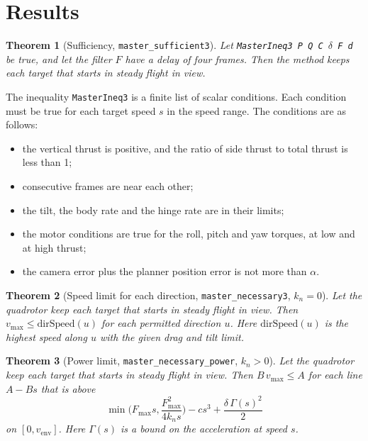 \documentclass[11pt]{article}
\newtheorem{theorem}{Theorem}
\theoremstyle{definition}
\newcommand{\lean}[1]{\texttt{\small #1}}
\begin{document}
\section{Results}

\begin{theorem}[Sufficiency, \lean{master\_sufficient3}]
Let \lean{MasterIneq3 P Q C $\delta$ F d} be true, and let the filter $F$ have a delay of four frames.
Then the method keeps each target that starts in steady flight in view.
\end{theorem}

The inequality \lean{MasterIneq3} is a finite list of scalar conditions.
Each condition must be true for each target speed $s$ in the speed range.
The conditions are as follows:
\begin{itemize}
\item the vertical thrust is positive, and the ratio of side thrust to total thrust is less than 1;
\item consecutive frames are near each other;
\item the tilt, the body rate and the hinge rate are in their limits;
\item the motor conditions are true for the roll, pitch and yaw torques, at low and at high thrust;
\item the camera error plus the planner position error is not more than $\alpha$.
\end{itemize}

\begin{theorem}[Speed limit for each direction, \lean{master\_necessary3}, $k_n = 0$]
Let the quadrotor keep each target that starts in steady flight in view.
Then $v_{\max} \le \mathrm{dirSpeed}(u)$ for each permitted direction $u$.
Here $\mathrm{dirSpeed}(u)$ is the highest speed along $u$ with the given drag and tilt limit.
\end{theorem}

\begin{theorem}[Power limit, \lean{master\_necessary\_power}, $k_n > 0$]
Let the quadrotor keep each target that starts in steady flight in view.
Then $B\,v_{\max} \le A$ for each line $A - B s$ that is above
\begin{equation}
  \min\!\Big(F_{\max}s, \frac{F_{\max}^2}{4k_n s}\Big) - c s^3 + \frac{\delta\, \Gamma(s)^2}{2}
\end{equation}
on $[0, v_{\mathrm{env}}]$.
Here $\Gamma(s)$ is a bound on the acceleration at speed $s$.
\end{theorem}
\end{document}
